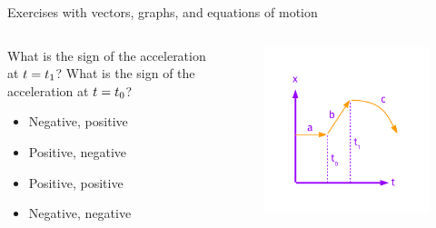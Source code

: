 \documentclass{beamer}
\begin{document}
\begin{frame}{Exercises with vectors, graphs, and equations of motion}
\begin{columns}[T]
\begin{column}{0.4\textwidth}
\small
What is the sign of the acceleration at $t=t_{\rm 1}$?  What is the sign of the acceleration at $t=t_{\rm 0}$?
\begin{itemize}
\item Negative, positive
\item Positive, negative
\item Positive, positive
\item Negative, negative
\end{itemize}
\end{column}
\begin{column}{0.6\textwidth}
\begin{figure}
\centering
\includegraphics[width=\textwidth,trim=0cm 0cm 0cm 1.5cm,clip=true]{figures/FurtherExercises.pdf}
\end{figure}
\end{column}
\end{columns}
\end{frame}
\end{document}
